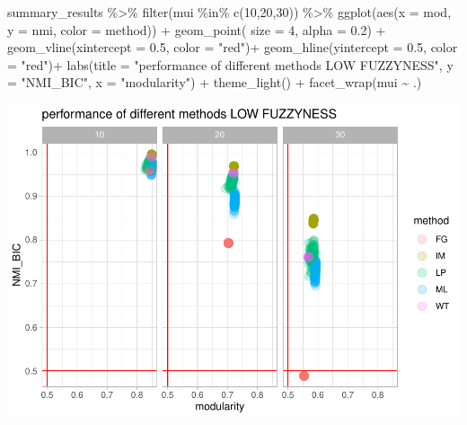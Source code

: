 \documentclass[
]{article}
\newenvironment{Shaded}{\begin{snugshade}}{\end{snugshade}}
\newcommand{\AttributeTok}[1]{\textcolor[rgb]{0.77,0.63,0.00}{#1}}
\newcommand{\DecValTok}[1]{\textcolor[rgb]{0.00,0.00,0.81}{#1}}
\newcommand{\FloatTok}[1]{\textcolor[rgb]{0.00,0.00,0.81}{#1}}
\newcommand{\FunctionTok}[1]{\textcolor[rgb]{0.00,0.00,0.00}{#1}}
\newcommand{\NormalTok}[1]{#1}
\newcommand{\SpecialCharTok}[1]{\textcolor[rgb]{0.00,0.00,0.00}{#1}}
\newcommand{\StringTok}[1]{\textcolor[rgb]{0.31,0.60,0.02}{#1}}
\begin{document}
\begin{Shaded}
\begin{Highlighting}[]
\NormalTok{summary\_results }\SpecialCharTok{\%\textgreater{}\%} 
  \FunctionTok{filter}\NormalTok{(mui }\SpecialCharTok{\%in\%} \FunctionTok{c}\NormalTok{(}\DecValTok{10}\NormalTok{,}\DecValTok{20}\NormalTok{,}\DecValTok{30}\NormalTok{)) }\SpecialCharTok{\%\textgreater{}\%} 
  \FunctionTok{ggplot}\NormalTok{(}\FunctionTok{aes}\NormalTok{(}\AttributeTok{x =}\NormalTok{ mod, }\AttributeTok{y =}\NormalTok{ nmi, }\AttributeTok{color =}\NormalTok{ method)) }\SpecialCharTok{+}
  \FunctionTok{geom\_point}\NormalTok{( }\AttributeTok{size =} \DecValTok{4}\NormalTok{, }\AttributeTok{alpha =} \FloatTok{0.2}\NormalTok{) }\SpecialCharTok{+}
  \FunctionTok{geom\_vline}\NormalTok{(}\AttributeTok{xintercept =} \FloatTok{0.5}\NormalTok{, }\AttributeTok{color =} \StringTok{"red"}\NormalTok{)}\SpecialCharTok{+}
  \FunctionTok{geom\_hline}\NormalTok{(}\AttributeTok{yintercept =} \FloatTok{0.5}\NormalTok{, }\AttributeTok{color =} \StringTok{"red"}\NormalTok{)}\SpecialCharTok{+}
    \FunctionTok{labs}\NormalTok{(}\AttributeTok{title =} \StringTok{"performance of different methods LOW FUZZYNESS"}\NormalTok{, }\AttributeTok{y =} \StringTok{"NMI\_BIC"}\NormalTok{, }\AttributeTok{x =} \StringTok{"modularity"}\NormalTok{) }\SpecialCharTok{+}
  \FunctionTok{theme\_light}\NormalTok{()  }\SpecialCharTok{+} \FunctionTok{facet\_wrap}\NormalTok{(mui }\SpecialCharTok{\textasciitilde{}}\NormalTok{ .)}
\end{Highlighting}
\end{Shaded}

\includegraphics{com_det_algorithms_files/figure-latex/unnamed-chunk-17-1.pdf}
\end{document}
